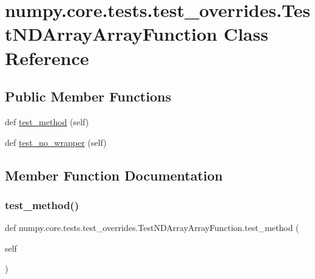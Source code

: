 \hypertarget{classnumpy_1_1core_1_1tests_1_1test__overrides_1_1TestNDArrayArrayFunction}{}\section{numpy.\+core.\+tests.\+test\+\_\+overrides.\+Test\+N\+D\+Array\+Array\+Function Class Reference}
\label{classnumpy_1_1core_1_1tests_1_1test__overrides_1_1TestNDArrayArrayFunction}
\subsection*{Public Member Functions}
\begin{DoxyCompactItemize}
\item 
def \hyperlink{classnumpy_1_1core_1_1tests_1_1test__overrides_1_1TestNDArrayArrayFunction_a36ddbd33654283fd0f6963ce1b7915da}{test\+\_\+method} (self)
\item 
def \hyperlink{classnumpy_1_1core_1_1tests_1_1test__overrides_1_1TestNDArrayArrayFunction_a31d3c754b9194c8e2423f88ef5de7f50}{test\+\_\+no\+\_\+wrapper} (self)
\end{DoxyCompactItemize}


\subsection{Member Function Documentation}
\mbox{\label{classnumpy_1_1core_1_1tests_1_1test__overrides_1_1TestNDArrayArrayFunction_a36ddbd33654283fd0f6963ce1b7915da}} 
\subsubsection{\texorpdfstring{test\+\_\+method()}{test\_method()}}
{\footnotesize\ttfamily def numpy.\+core.\+tests.\+test\+\_\+overrides.\+Test\+N\+D\+Array\+Array\+Function.\+test\+\_\+method (\begin{DoxyParamCaption}\item[{}]{self }\end{DoxyParamCaption})}

